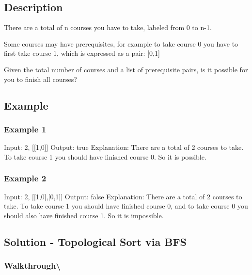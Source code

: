 \documentclass[]{book}
\begin{document}
\hypertarget{description-83}{%
\subsection{Description}\label{description-83}}

There are a total of n courses you have to take, labeled from 0 to n-1.

Some courses may have prerequisites, for example to take course 0 you have to first take course 1, which is expressed
as a pair: {[}0,1{]}

Given the total number of courses and a list of prerequisite pairs, is it possible for you to finish all courses?

\hypertarget{example-79}{%
\subsection{Example}\label{example-79}}

\hypertarget{example-1-1}{%
\subsubsection{Example 1}\label{example-1-1}}

Input: 2, {[}{[}1,0{]}{]}
Output: true
Explanation: There are a total of 2 courses to take.
To take course 1 you should have finished course 0. So it is possible.

\hypertarget{example-2-1}{%
\subsubsection{Example 2}\label{example-2-1}}

Input: 2, {[}{[}1,0{]},{[}0,1{]}{]}
Output: false
Explanation: There are a total of 2 courses to take.
To take course 1 you should have finished course 0, and to take course 0 you should
also have finished course 1. So it is impossible.

\hypertarget{solution---topological-sort-via-bfs}{%
\subsection{Solution - Topological Sort via BFS}\label{solution---topological-sort-via-bfs}}

\hypertarget{walkthrough-95}{%
\subsubsection{Walkthrough\textbackslash{}}\label{walkthrough-95}}
\end{document}
